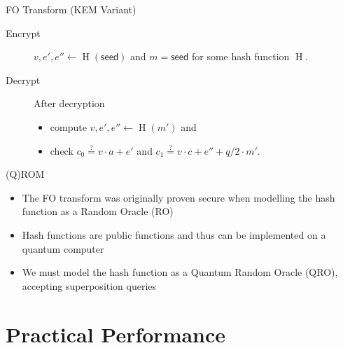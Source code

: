 \documentclass[xcolor=table,10pt,aspectratio=169]{beamer}
\begin{document}
\begin{frame}[label={sec:orge5f8678}]{FO Transform (KEM Variant)}
\begin{description}
\item[{Encrypt}] \(v,e', e'' \gets \operatorname{H}(\mathsf{seed})\) and \(m = \mathsf{seed}\) for some hash function \(\operatorname{H}\).
\item[{Decrypt}] After decryption
\begin{itemize}
\item compute \(v,e', e'' \gets \operatorname{H}(m')\) and
\item check \(c_{0} \overset{?}{=} v\cdot a + e'\) and \(c_{1} \overset{?}{=} v \cdot c + e'' + q/2 \cdot m'\).
\end{itemize}
\end{description}


\end{frame}

\begin{frame}[label={sec:orga7beb36}]{(Q)ROM}
\begin{itemize}
\item The FO transform was originally proven secure when modelling the hash function as a Random Oracle (RO)
\item Hash functions are public functions and thus can be implemented on a quantum computer
\item We must model the hash function as a Quantum Random Oracle (QRO), accepting superposition queries
\end{itemize}

\end{frame}

\section{Practical Performance}
\label{sec:orge44c465}
\end{document}

